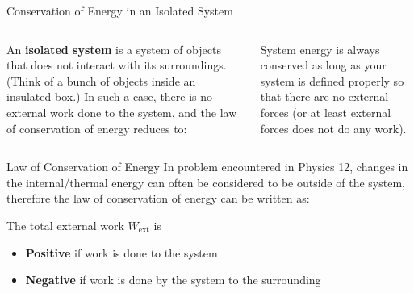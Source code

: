 \documentclass[12pt,compress,aspectratio=169]{beamer}
\begin{document}
\begin{frame}{Conservation of Energy in an Isolated System}
  \begin{columns}
    \centering

    An \textbf{isolated system} is a system of objects that does not interact
    with its surroundings. (Think of a bunch of objects inside an insulated
    box.) In such a case, there is no external work done to the system,
    and the law of conservation of energy reduces to:
    

    System energy is always conserved as long as your system is defined properly
    so that there are no external forces (or at least external forces does not
    do any work).
  \end{columns}
\end{frame}



\begin{frame}{Law of Conservation of Energy}
  In problem encountered in Physics 12, changes in the internal/thermal energy
  can often be considered to be outside of the system, therefore the law of
  conservation of energy can be written as:
  

  The total external work $W_\text{ext}$ is
  \begin{itemize}
  \item\textbf{Positive} if work is done {\color{red}to} the system
  \item\textbf{Negative} if work is done {\color{red}by} the system to the
    surrounding
  \end{itemize}
\end{frame}
\end{document}
